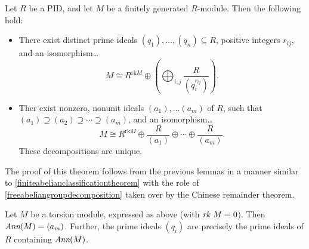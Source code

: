 \begin{theorem}
\label{classificationoffinitelygeneratedmodulesoverPIDs}
Let $R$ be a PID, and let $M$ be a finitely generated $R$-module. Then the following hold:
\begin{itemize}
  \item There exist distinct prime ideals $(q_1), \dots, (q_n) \subseteq R$, positive integers $r_{ij}$, and an isomorphism\dots
  $$M \cong R^{\textrm{rk} M} \oplus \left( \bigoplus_{i,j} \frac{R}{(q_i^{r_{ij}})} \right).$$
  \item Ther exist nonzero, nonunit ideals $(a_1), \dots (a_m)$ of $R$, such that $(a_1) \supseteq (a_2) \supseteq \cdots \supseteq (a_m)$, and an isomorphism\dots
  $$M \cong R^{\textrm{rk}M} \oplus \frac{R}{(a_1)} \oplus \cdots \oplus \frac{R}{(a_m)}.$$
  These decompositions are unique.
\end{itemize}
\end{theorem}
The proof of this theorem follows from the previous lemmas in a manner similar to \ref{finiteabelianclassificationtheorem} with the role of \ref{freeabeliangroupdecomposition}
taken over by the Chinese remainder theorem.

\begin{lemma}
Let $M$ be a torsion module, expressed as above (with $\emph{rk }M = 0$). Then $\emph{Ann}(M) = (a_m)$. Further, the prime ideals $(q_i)$ are precisely the prime ideals of $R$
containing $\emph{Ann}(M)$.
\end{lemma}